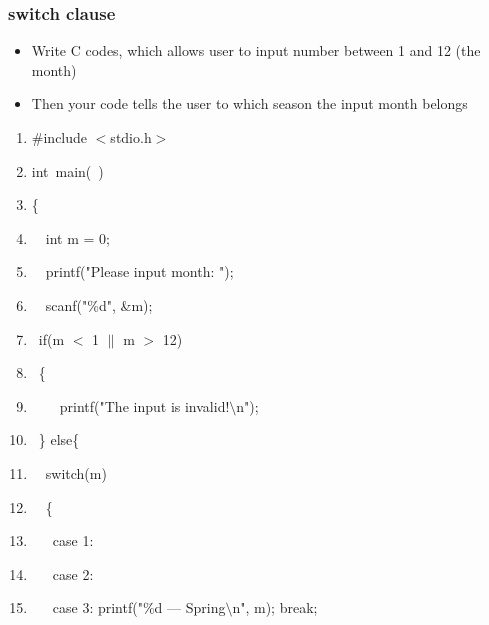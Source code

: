%

\begin{frame}
\frametitle{switch clause}
\begin{itemize}
	\item {Write C codes, which allows user to input number between 1 and 12 (the month)}
	\item {Then your code tells the user to which season the input month belongs}
\end{itemize}
\end{frame}

\ifx\answer{}
\begin{frame}
	\begin{enumerate}
		\item {\#include $<$stdio.h$>$}
		\item {int~main(~)}
		\item {\{}
		\item {~~int m = 0;}
		\item {~~printf("Please input month: ");}
		\item {~~scanf("\%d", \&m);}
		\item {~if(m $<$ 1 $\parallel$ m $>$ 12)}
		\item {~\{}
		\item {~~~~printf("The input is invalid!$\setminus$n");}
		\item {~\} else\{}
		\item {~~switch(m)}
		\item {~~\{}
		\item {~~~case 1:}
		\item {~~~case 2:}
		\item {~~~case 3: printf("\%d --- Spring$\setminus$n", m); break;}
	\end{enumerate}
\end{frame}

